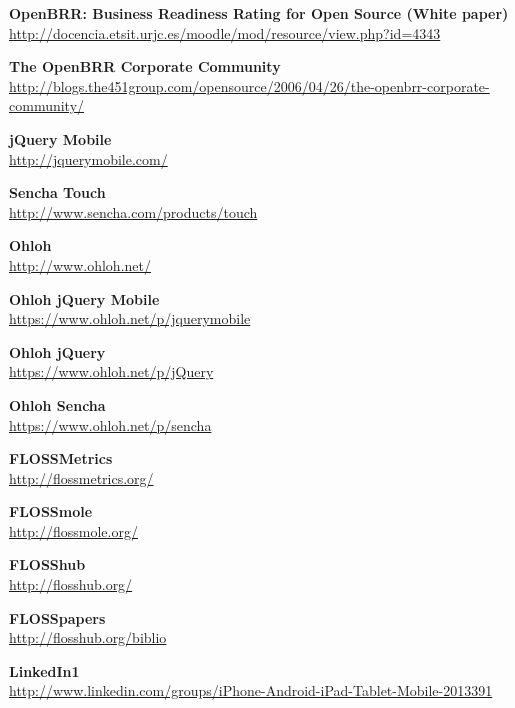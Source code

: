 \documentclass[a4paper,12pt]{book}
\begin{document}
\begin{thebibliography}{25}
 

\textbf{OpenBRR: Business Readiness Rating for
Open Source (White paper)}\\
{\footnotesize\url{
http://docencia.etsit.urjc.es/moodle/mod/resource/view.php?id=4343}}

\textbf{The OpenBRR Corporate Community}\\
{\footnotesize\url{http://blogs.the451group.com/opensource/2006/04/26/the-openbrr-corporate-community/}}

\textbf{jQuery Mobile}\\
{\footnotesize\url{http://jquerymobile.com/}}

\textbf{Sencha Touch}\\
{\footnotesize\url{http://www.sencha.com/products/touch}}

\textbf{Ohloh}\\
{\footnotesize\url{http://www.ohloh.net/}}

\textbf{Ohloh jQuery Mobile}\\
{\footnotesize\url{https://www.ohloh.net/p/jquerymobile}}

\textbf{Ohloh jQuery}\\
{\footnotesize\url{https://www.ohloh.net/p/jQuery}}

\textbf{Ohloh Sencha}\\
{\footnotesize\url{https://www.ohloh.net/p/sencha}}

\textbf{FLOSSMetrics}\\
{\footnotesize\url{http://flossmetrics.org/}}

\textbf{FLOSSmole}\\
{\footnotesize\url{http://flossmole.org/}}

\textbf{FLOSShub}\\
{\footnotesize\url{http://flosshub.org/}}

\textbf{FLOSSpapers}\\
{\footnotesize\url{http://flosshub.org/biblio}}

\textbf{LinkedIn1}\\
{\footnotesize\url{http://www.linkedin.com/groups/iPhone-Android-iPad-Tablet-Mobile-2013391}}


\end{thebibliography}
\end{document}
